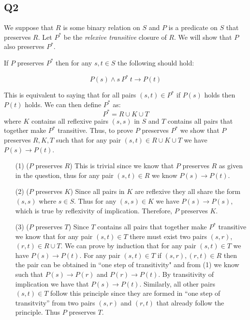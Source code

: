 \documentclass[12pt, fleqn]{article}
\begin{document}
\subsection{Q2}

We suppose that $R$ is some binary relation on $S$ and $P$ is a predicate on $S$ that preserves $R$. 
Let $P^*$ be the \emph{relexive transitive} closure of $R$. We will show that $P$ also preserves $P^*$.

\medskip

If $P$ preserves $P^*$ then for any $s, t \in S$ the following should hold:

$$P(s) \land s~P^*~t \rightarrow P(t)$$

This is equivalent to saying that for all pairs $(s, t) \in P^*$ if $P(s)$ holds then $P(t)$ holds. We can then
define $P^*$ as:
$$P^* = R \cup K \cup T$$
where $K$ contains all reflexive pairs $(s, s)$ in $S$ and $T$ contains all pairs that together make $P^*$ transitive.
Thus, to prove $P$ preserves $P^*$ we show that $P$ preserves $R, K, T$ such that for any pair $(s, t) \in R \cup K \cup T$ we
have $P(s) \rightarrow P(t)$.

\begin{enumerate}
    \item[(1)] ($P$ preserves $R$) This is trivial since we know that $P$ preserves  $R$ as given in the question, thus for any
    pair $(s, t) \in R$ we know $P(s) \rightarrow P(t)$.
     
    \item[(2)] ($P$ preserves $K$) Since all pairs in $K$ are reflexive they all share the form $(s, s)$ where $s \in S$. 
    Thus for any $(s, s) \in K$ we have $P(s) \rightarrow P(s)$, which is true by reflexivity of implication. Therefore, $P$
    preserves $K$.

    \item[(3)] ($P$ preserves $T$) Since $T$ contains all pairs that together make $P^*$ transitive we know that for any pair
    $(s, t) \in T$ there must exist two pairs $(s, r)$,$(r, t) \in R \cup T$. 
    We can prove by induction that for any pair $(s, t) \in T$ we have $P(s) \rightarrow P(t)$. For any pair $(s, t) \in T$
    if $(s, r),(r,t) \in R$ then the pair can be obtained in ``one step of transitivity" and from (1) we know such 
    that $P(s) \rightarrow P(r)$ and $P(r) \rightarrow P(t)$. By transitivity of implication we have that $P(s) \rightarrow P(t)$.
    Similarly, all other pairs $(s, t) \in T$ follow this principle since they are formed in ``one step of transitvity'' from two pairs 
    $(s, r)$ and $(r, t)$ that already follow the principle. Thus $P$ preserves $T$.
\end{enumerate}
\end{document}
